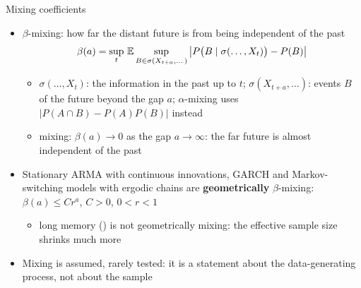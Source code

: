 \begin{frame}{Mixing coefficients}
\itemsize{\small}
\begin{itemize}
    \item $\beta$-mixing: how far the distant future is from being independent of the past
    \[ \beta(a) = \sup_t\,\mathbb{E}\sup_{B\in\sigma(X_{t+a},\dots)}\big|P\big(B\mid\sigma(\dots,X_t)\big) - P(B)\big| \]
    \begin{itemize}
        \item $\sigma(\dots, X_t)$: the information in the past up to $t$; $\sigma(X_{t+a}, \dots)$: events $B$ of the future beyond the gap $a$; $\alpha$-mixing uses $|P(A\cap B) - P(A)P(B)|$ instead
        \item mixing: $\beta(a) \to 0$ as the gap $a \to \infty$: the far future is almost independent of the past
    \end{itemize}
    \item Stationary ARMA with continuous innovations, GARCH and Markov-switching models with ergodic chains are \textbf{geometrically} $\beta$-mixing: $\beta(a) \le Cr^a$, $C > 0$, $0 < r < 1$
    \begin{itemize}
        \item long memory () is not geometrically mixing: the effective sample size shrinks much more
    \end{itemize}
    \item Mixing is assumed, rarely tested: it is a statement about the data-generating process, not about the sample
\end{itemize}
\end{frame}

